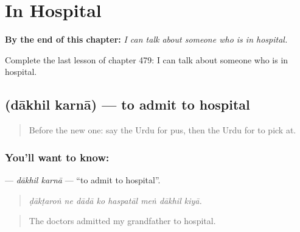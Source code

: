 
\chapter{In Hospital}
\label{ch:ur-in-hospital}

\begin{chapteropening}
\textbf{By the end of this chapter:} \emph{I can talk about someone who is in hospital.}

Complete the last lesson of chapter 479: I can talk about someone who is in hospital.
\end{chapteropening}

\section[\texorpdfstring{\ur{داخل} \ur{کرنا} (dākhil karnā)}{داخل کرنا (dākhil karnā)}]{  (dākhil karnā) — to admit to hospital}

\label{lesson:UR-C479-dakhil-karna}



\begin{quote}
Before the new one: say the Urdu for pus, then the Urdu for to pick at.
\end{quote}

\subsection*{You'll want to know:  }
\textbf{ } — \emph{dākhil karnā} — \textquotedblleft{}to admit to hospital\textquotedblright{}.

\begin{quote}
       
\end{quote}

\begin{quote}
\emph{ḍākṭaroṅ ne dādā ko haspatāl meṅ dākhil kiyā.}
\end{quote}

\begin{quote}
The doctors admitted my grandfather to hospital.
\end{quote}

